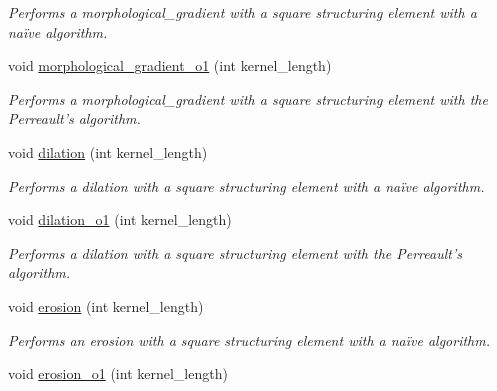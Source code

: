 \begin{DoxyCompactItemize}
\begin{DoxyCompactList}\small\item\em Performs a morphological\-\_\-gradient with a square structuring element with a naïve algorithm. \end{DoxyCompactList}\item 
\hypertarget{classofeli_1_1_filters_a13b390c3705e19c211c04f47daa17844}{void \hyperlink{classofeli_1_1_filters_a13b390c3705e19c211c04f47daa17844}{morphological\-\_\-gradient\-\_\-o1} (int kernel\-\_\-length)}\label{classofeli_1_1_filters_a13b390c3705e19c211c04f47daa17844}

\begin{DoxyCompactList}\small\item\em Performs a morphological\-\_\-gradient with a square structuring element with the Perreault's algorithm. \end{DoxyCompactList}\item 
\hypertarget{classofeli_1_1_filters_aceefc0f308d675d2cb752bd4a7a22dd1}{void \hyperlink{classofeli_1_1_filters_aceefc0f308d675d2cb752bd4a7a22dd1}{dilation} (int kernel\-\_\-length)}\label{classofeli_1_1_filters_aceefc0f308d675d2cb752bd4a7a22dd1}

\begin{DoxyCompactList}\small\item\em Performs a dilation with a square structuring element with a naïve algorithm. \end{DoxyCompactList}\item 
\hypertarget{classofeli_1_1_filters_a806b4e3976167324fa019d825e00286d}{void \hyperlink{classofeli_1_1_filters_a806b4e3976167324fa019d825e00286d}{dilation\-\_\-o1} (int kernel\-\_\-length)}\label{classofeli_1_1_filters_a806b4e3976167324fa019d825e00286d}

\begin{DoxyCompactList}\small\item\em Performs a dilation with a square structuring element with the Perreault's algorithm. \end{DoxyCompactList}\item 
\hypertarget{classofeli_1_1_filters_ab9bc3d5a53898251178515d5d6be8293}{void \hyperlink{classofeli_1_1_filters_ab9bc3d5a53898251178515d5d6be8293}{erosion} (int kernel\-\_\-length)}\label{classofeli_1_1_filters_ab9bc3d5a53898251178515d5d6be8293}

\begin{DoxyCompactList}\small\item\em Performs an erosion with a square structuring element with a naïve algorithm. \end{DoxyCompactList}\item 
\hypertarget{classofeli_1_1_filters_a8f6d16a2ebbc52ea041cda0c7336343a}{void \hyperlink{classofeli_1_1_filters_a8f6d16a2ebbc52ea041cda0c7336343a}{erosion\-\_\-o1} (int kernel\-\_\-length)}\label{classofeli_1_1_filters_a8f6d16a2ebbc52ea041cda0c7336343a}


\end{DoxyCompactItemize}
